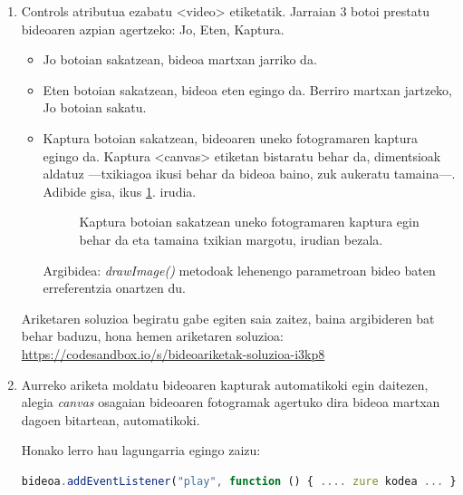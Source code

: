 \begin{enumerate}
    \item  Controls atributua ezabatu <video> etiketatik. Jarraian 3 botoi prestatu bideoaren azpian agertzeko: Jo, Eten, Kaptura.

\begin{itemize}
    \item Jo botoian sakatzean, bideoa martxan jarriko da.
     \item  Eten botoian sakatzean, bideoa eten egingo da. Berriro martxan jartzeko, Jo botoian sakatu.
     \item Kaptura botoian sakatzean, bideoaren uneko fotogramaren kaptura egingo da. Kaptura
     <canvas> etiketan bistaratu behar da, dimentsioak aldatuz —txikiagoa ikusi behar da bideoa baino, zuk aukeratu tamaina—. Adibide gisa, ikus \ref{fig:bideoariketa2}. irudia.
     
\begin{figure}[ht]
\centering
{}
\caption{Kaptura botoian sakatzean uneko fotogramaren kaptura egin behar da eta tamaina txikian margotu, irudian bezala.}
\label{fig:bideoariketa2}
\end{figure}
     
Argibidea:\textit{ drawImage()} metodoak lehenengo parametroan bideo baten erreferentzia onartzen du. 
\end{itemize}

Ariketaren soluzioa begiratu gabe egiten saia zaitez, baina argibideren bat behar baduzu, hona hemen ariketaren soluzioa:\newline \href{https://codesandbox.io/s/bideoariketak-soluzioa-i3kp8}{ https://codesandbox.io/s/bideoariketak-soluzioa-i3kp8}

\item Aurreko ariketa moldatu bideoaren kapturak automatikoki egin daitezen, alegia \textit{canvas} osagaian bideoaren fotogramak agertuko dira bideoa martxan dagoen bitartean, automatikoki.

Honako lerro hau lagungarria egingo zaizu:

\begin{lstlisting}[language=JavaScript,numbers=none]
bideoa.addEventListener("play", function () { .... zure kodea ... }
\end{lstlisting}


\end{enumerate}
